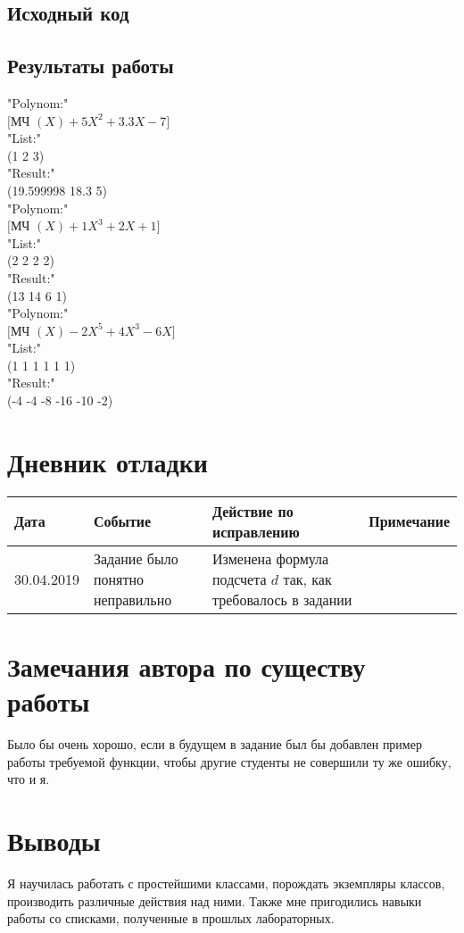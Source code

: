 \documentclass[12pt]{article}
\begin{document}
\subsection{Исходный код}


\subsection{Результаты работы}
"Polynom:" \\
$[$МЧ $(X) +5X^{2}+3.3X-7]$ \\ 
"List:" \\
(1 2 3) \\
"Result:" \\
(19.599998 18.3 5) \\
"Polynom:" \\
$[$МЧ $(X) +1X^{3}+2X+1]$ \\
"List:" \\
(2 2 2 2) \\
"Result:" \\
(13 14 6 1) \\
"Polynom:" \\
$[$МЧ $(X) -2X^{5}+4X^{3}-6X]$ \\
"List:" \\
(1 1 1 1 1 1) \\
"Result:" \\
(-4 -4 -8 -16 -10 -2)  \\

\section{Дневник отладки}
\begin{tabular}{|p{50pt}|p{130pt}|p{130pt}|p{70pt}|}
\hline
Дата & Событие & Действие по исправлению & Примечание \\ \hline
30.04.2019 & Задание было понятно неправильно & Изменена формула подсчета $d$ так, как требовалось в задании &\\
\hline
\end{tabular}

\section{Замечания автора по существу работы}
Было бы очень хорошо, если в будущем в задание был бы добавлен пример работы требуемой функции, чтобы другие студенты не совершили ту же ошибку, что и я.

\section{Выводы}
Я научилась работать с простейшими классами, порождать экземпляры классов, производить различные действия над ними. Также мне пригодились навыки работы со списками, полученные в прошлых лабораторных.
\end{document}
